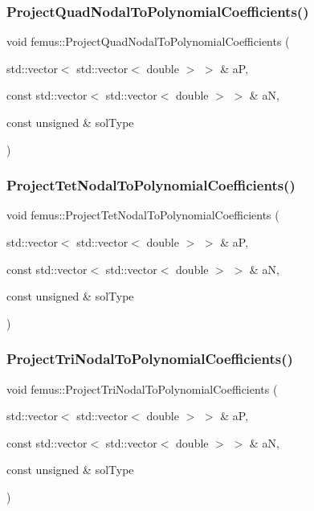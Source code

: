 \subsubsection{\texorpdfstring{Project\+Quad\+Nodal\+To\+Polynomial\+Coefficients()}{ProjectQuadNodalToPolynomialCoefficients()}}
{\footnotesize\ttfamily void femus\+::\+Project\+Quad\+Nodal\+To\+Polynomial\+Coefficients (\begin{DoxyParamCaption}\item[{std\+::vector$<$ std\+::vector$<$ double $>$ $>$ \&}]{aP,  }\item[{const std\+::vector$<$ std\+::vector$<$ double $>$ $>$ \&}]{aN,  }\item[{const unsigned \&}]{sol\+Type }\end{DoxyParamCaption})}

\mbox{\label{namespacefemus_acd82a35cce2441436e19a7fbc240b13c}} 
\subsubsection{\texorpdfstring{Project\+Tet\+Nodal\+To\+Polynomial\+Coefficients()}{ProjectTetNodalToPolynomialCoefficients()}}
{\footnotesize\ttfamily void femus\+::\+Project\+Tet\+Nodal\+To\+Polynomial\+Coefficients (\begin{DoxyParamCaption}\item[{std\+::vector$<$ std\+::vector$<$ double $>$ $>$ \&}]{aP,  }\item[{const std\+::vector$<$ std\+::vector$<$ double $>$ $>$ \&}]{aN,  }\item[{const unsigned \&}]{sol\+Type }\end{DoxyParamCaption})}

\mbox{\label{namespacefemus_a9b37c908983e9f07e8aa7d6a56862eee}} 
\subsubsection{\texorpdfstring{Project\+Tri\+Nodal\+To\+Polynomial\+Coefficients()}{ProjectTriNodalToPolynomialCoefficients()}}
{\footnotesize\ttfamily void femus\+::\+Project\+Tri\+Nodal\+To\+Polynomial\+Coefficients (\begin{DoxyParamCaption}\item[{std\+::vector$<$ std\+::vector$<$ double $>$ $>$ \&}]{aP,  }\item[{const std\+::vector$<$ std\+::vector$<$ double $>$ $>$ \&}]{aN,  }\item[{const unsigned \&}]{sol\+Type }\end{DoxyParamCaption})}

